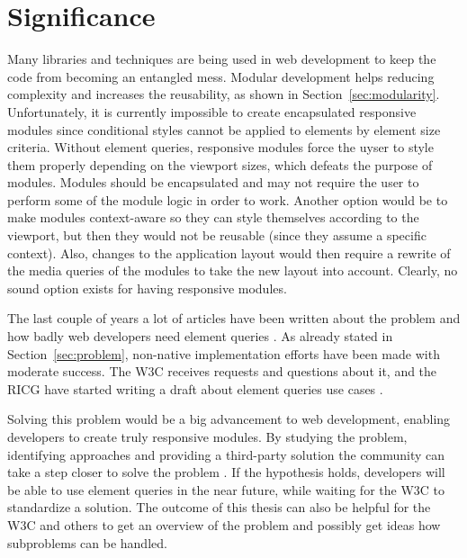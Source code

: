 \documentclass[a4paper,11pt]{kth-mag}
\begin{document}
    \section{Significance}
      Many libraries and techniques are being used in \gls{web} development to keep the code from becoming an entangled mess.
      Modular development helps reducing complexity and increases the reusability, as shown in Section~\ref{sec:modularity}.
      Unfortunately, it is currently impossible to create \gls{encapsulated} \gls{responsive} modules since conditional styles cannot be applied to \glspl{element} by \gls{element} size criteria.
      Without element queries, \gls{responsive} modules force the uyser to style them properly depending on the \gls{viewport} sizes, which defeats the purpose of modules.
      Modules should be \gls{encapsulated} and may not require the user to perform some of the module logic in order to work.
      Another option would be to make modules context-aware so they can style themselves according to the \gls{viewport}, but then they would not be reusable (since they assume a specific context).
      Also, changes to the application layout would then require a rewrite of the \gls{media queries} of the modules to take the new layout into account.
      Clearly, no sound option exists for having \gls{responsive} modules.

      The last couple of years a lot of articles have been written about the problem and how badly \gls{web} developers need element queries \cite{eq_article_localised-css,eq_article_backalley,eq_article_mqhack,eq_article_tabatkjr,eq_article_filament,eq_article_tyson,eq_article_neal,eq_article_css-tricks,eq_article_hugo,eq_article_fremycompany,eq_article_discource,eq_article_matt}.
      As already stated in Section~\ref{sec:problem}, non-\gls{native} implementation efforts have been made with moderate success.
      The \gls{W3C} receives requests and questions about it, and the \gls{RICG} have started writing a draft about element queries use cases \cite{ricg_draft}.

      Solving this problem would be a big advancement to \gls{web} development, enabling developers to create truly \gls{responsive} modules.
      By studying the problem, identifying approaches and providing a \gls{third-party} solution the community can take a step closer to solve the problem .
      If the hypothesis holds, developers will be able to use element queries in the near future, while waiting for the \gls{W3C} to standardize a solution.
      The outcome of this thesis can also be helpful for the \gls{W3C} and others to get an overview of the problem and possibly get ideas how subproblems can be handled.
\end{document}

